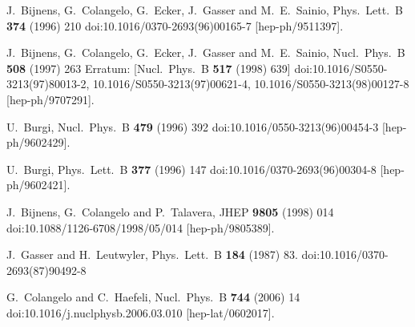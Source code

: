 \documentclass[12pt,a4paper]{article}
\begin{document}
\begin{thebibliography}{99}
  J.~Bijnens, G.~Colangelo, G.~Ecker, J.~Gasser and M.~E.~Sainio,
  Phys.\ Lett.\ B {\bf 374} (1996) 210
  doi:10.1016/0370-2693(96)00165-7
  [hep-ph/9511397].

  J.~Bijnens, G.~Colangelo, G.~Ecker, J.~Gasser and M.~E.~Sainio,
  Nucl.\ Phys.\ B {\bf 508} (1997) 263
   Erratum: [Nucl.\ Phys.\ B {\bf 517} (1998) 639]
  doi:10.1016/S0550-3213(97)80013-2, 10.1016/S0550-3213(97)00621-4, 10.1016/S0550-3213(98)00127-8
  [hep-ph/9707291].

  U.~Burgi,
  Nucl.\ Phys.\ B {\bf 479} (1996) 392
  doi:10.1016/0550-3213(96)00454-3
  [hep-ph/9602429].

  U.~Burgi,
  Phys.\ Lett.\ B {\bf 377} (1996) 147
  doi:10.1016/0370-2693(96)00304-8
  [hep-ph/9602421].

  J.~Bijnens, G.~Colangelo and P.~Talavera,
  JHEP {\bf 9805} (1998) 014
  doi:10.1088/1126-6708/1998/05/014
  [hep-ph/9805389].

  J.~Gasser and H.~Leutwyler,
  Phys.\ Lett.\ B {\bf 184} (1987) 83.
  doi:10.1016/0370-2693(87)90492-8

  G.~Colangelo and C.~Haefeli,
  Nucl.\ Phys.\ B {\bf 744} (2006) 14
  doi:10.1016/j.nuclphysb.2006.03.010
  [hep-lat/0602017].

\end{thebibliography}

\newpage
{}
{}\printindex
\end{document}
